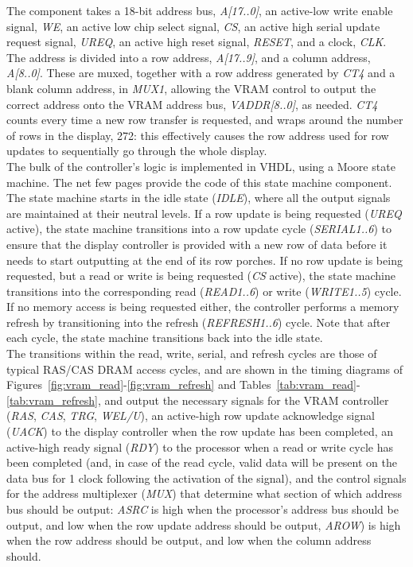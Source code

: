 \documentclass[titlepage]{scrartcl}
\begin{document}
	The component takes a 18-bit address bus, \textit{A[17..0]}, an active-low write enable signal, \textit{WE}, an active low chip select signal, \textit{CS}, an active high serial update request signal, \textit{UREQ}, an active high reset signal, \textit{RESET}, and a clock, \textit{CLK}.\\

	The address is divided into a row address, \textit{A[17..9]}, and a column address, \textit{A[8..0]}. These are muxed, together with a row address generated by \textit{CT4} and a blank column address, in \textit{MUX1}, allowing the VRAM control to output the correct address onto the VRAM address bus, \textit{VADDR[8..0]}, as needed. \textit{CT4} counts every time a new row transfer is requested, and wraps around the number of rows in the display, 272: this effectively causes the row address used for row updates to sequentially go through the whole display.\\

	The bulk of the controller's logic is implemented in VHDL, using a Moore state machine. The net few pages provide the code of this state machine component. The state machine starts in the idle state (\textit{IDLE}), where all the output signals are maintained at their neutral levels. If a row update is being requested (\textit{UREQ} active), the state machine transitions into a row update cycle (\textit{SERIAL1..6}) to ensure that the display controller is provided with a new row of data before it needs to start outputting at the end of its row porches. If no row update is being requested, but a read or write is being requested (\textit{CS} active), the state machine transitions into the corresponding read (\textit{READ1..6}) or write (\textit{WRITE1..5}) cycle. If no memory access is being requested either, the controller performs a memory refresh by transitioning into the refresh (\textit{REFRESH1..6}) cycle. Note that after each cycle, the state machine transitions back into the idle state.\\

	

	The transitions within the read, write, serial, and refresh cycles are those of typical RAS/CAS DRAM access cycles, and are shown in the timing diagrams of Figures~\ref{fig:vram_read}-\ref{fig:vram_refresh} and Tables~\ref{tab:vram_read}-\ref{tab:vram_refresh}, and output the necessary signals for the VRAM controller (\textit{RAS}, \textit{CAS}, \textit{TRG}, \textit{WEL/U}), an active-high row update acknowledge signal (\textit{UACK}) to the display controller when the row update has been completed, an active-high ready signal (\textit{RDY}) to the processor when a read or write cycle has been completed (and, in case of the read cycle, valid data will be present on the data bus for 1 clock following the activation of the signal), and the control signals for the address multiplexer (\textit{MUX}) that determine what section of which address bus should be output: \textit{ASRC} is high when the processor's address bus should be output, and low when the row update address should be output, \textit{AROW}) is high when the row address should be output, and low when the column address should.\\
\end{document}
